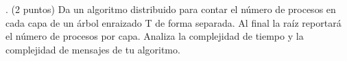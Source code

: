 . (2 puntos) Da un algoritmo distribuido para contar el número de procesos en cada capa de un árbol enraizado T de forma separada. Al final la raíz reportará el número de procesos por capa. Analiza la complejidad de tiempo y la complejidad de mensajes de tu algoritmo. 
